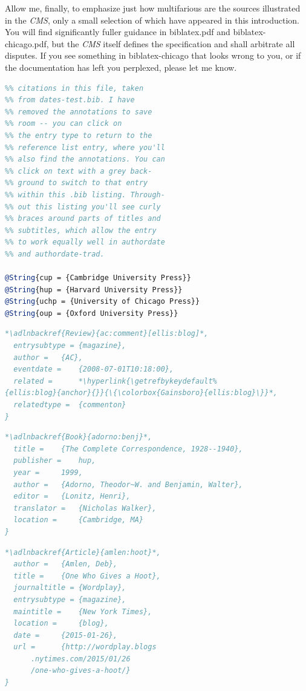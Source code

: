 \documentclass[a4paper,12pt]{article}
\begin{document}
Allow me, finally, to emphasize just how multifarious are the sources
illustrated in the \emph{CMS}, only a small selection of which have
appeared in this introduction.  You will find significantly fuller
guidance in \textsf{biblatex.pdf} and \textsf{biblatex-chicago.pdf},
but the \emph{CMS} itself defines the specification and shall
arbitrate all disputes.  If you see something in
\textsf{biblatex-chicago} that looks wrong to you, or if the
documentation has left you perplexed, please let me know.

\nocite{amlen:hoot}
\printbibliography[title=References]
\setlength{\textheight}{10.5in}
\vspace*{-6pt}
\begin{lstlisting}[language=BibTeX,label=prologue]
%% Database entries used to produce
%% citations in this file, taken
%% from dates-test.bib. I have
%% removed the annotations to save
%% room -- you can click on
%% the entry type to return to the
%% reference list entry, where you'll
%% also find the annotations. You can
%% click on text with a grey back-
%% ground to switch to that entry
%% within this .bib listing. Through-
%% out this listing you'll see curly
%% braces around parts of titles and
%% subtitles, which allow the entry
%% to work equally well in authordate
%% and authordate-trad.

@String{cup = {Cambridge University Press}}
@String{hup = {Harvard University Press}}
@String{uchp = {University of Chicago Press}}
@String{oup = {Oxford University Press}}
\end{lstlisting}
\begin{lstlisting}[language=BibTeX,label=ac:comment]
*\adlnbackref{Review}{ac:comment}[ellis:blog]*,
  entrysubtype = {magazine},
  author = 	 {AC},
  eventdate = 	 {2008-07-01T10:18:00},
  related = 	 *\hyperlink{\getrefbykeydefault%
{ellis:blog}{anchor}{}}{\{\colorbox{Gainsboro}{ellis:blog}\}}*,
  relatedtype =  {commenton}
}
\end{lstlisting}
\begin{lstlisting}[language=BibTeX,label=adorno:benj]
*\adlnbackref{Book}{adorno:benj}*,
  title = 	 {The Complete Correspondence, 1928--1940},
  publisher = 	 hup,
  year = 	 1999,
  author = 	 {Adorno, Theodor~W. and Benjamin, Walter},
  editor = 	 {Lonitz, Henri},
  translator = 	 {Nicholas Walker},
  location =     {Cambridge, MA}
}
\end{lstlisting}
\begin{lstlisting}[language=BibTeX,label=amlen:hoot]
*\adlnbackref{Article}{amlen:hoot}*,
  author = 	 {Amlen, Deb},
  title = 	 {One Who Gives a Hoot},
  journaltitle = {Wordplay},
  entrysubtype = {magazine},
  maintitle = 	 {New York Times},
  location = 	 {blog},
  date = 	 {2015-01-26},
  url = 	 {http://wordplay.blogs
      .nytimes.com/2015/01/26
      /one-who-gives-a-hoot/}
}
\end{lstlisting}
\end{document}
